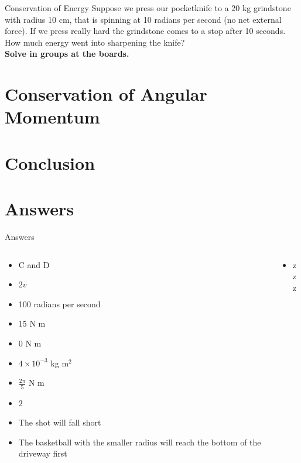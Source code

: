 \documentclass{beamer}
\begin{document}
\begin{frame}{Conservation of Energy}
Suppose we press our pocketknife to a 20 kg grindstone with radius 10 cm, that is spinning at 10 radians per second (no net external force).  If we press really hard the grindstone comes to a stop after 10 seconds.  How much energy went into sharpening the knife? \\ \vspace{1cm}
\textbf{Solve in groups at the boards.}
\end{frame}

\section{Conservation of Angular Momentum}



\section{Conclusion}

\section{Answers}

\begin{frame}{Answers}
\small
\begin{columns}[T]
\begin{column}{0.5\textwidth}
\begin{itemize}
\item C and D
\item $2v$
\item 100 radians per second
\item 15 N m
\item 0 N m
\item $4\times 10^{-3}$ kg m$^2$
\item $\frac{2\pi}{5}$ N m
\item $2$
\item The shot will fall short
\item The basketball with the smaller radius will reach the bottom of the driveway first
\end{itemize}
\end{column}
\begin{column}{0.5\textwidth}
\begin{itemize}
\item zzz
\end{itemize}
\end{column}
\end{columns}
\end{frame}
\end{document}
